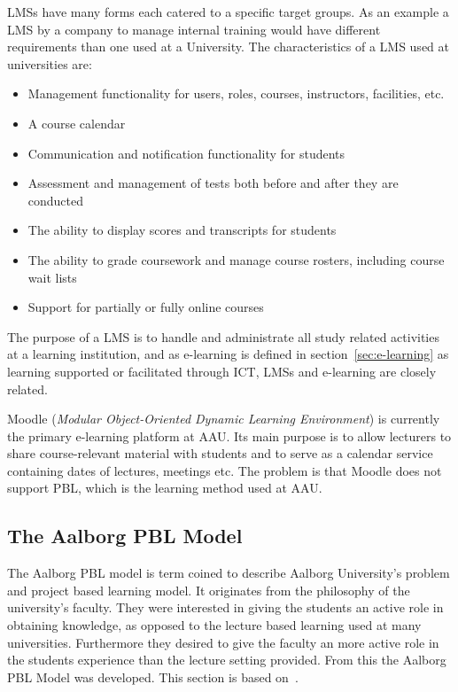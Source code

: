 LMSs have many forms each catered to a specific target groups. As an example a LMS by a company to manage internal training would have different requirements than one used at a University. The characteristics of a LMS used at universities are: 
\begin{itemize}
	\item Management functionality for users, roles, courses, instructors, facilities, etc.
	\item A course calendar
	\item Communication and notification functionality for students
	\item Assessment and management of tests both before and after they are conducted
	\item The ability to display scores and transcripts for students 
	\item The ability to grade coursework and manage course rosters, including course wait lists 
	\item Support for partially or fully online courses
\end{itemize}

The purpose of a LMS is to handle and administrate all study related activities at a learning institution, and as e-learning is defined in section~\ref{sec:e-learning} as learning supported or facilitated through ICT, LMSs and e-learning are closely related.

Moodle (\emph{Modular Object-Oriented Dynamic Learning Environment}) \citep{moodle} is currently the primary e-learning platform at AAU. Its main purpose is to allow lecturers to share course-relevant material with students and to serve as a calendar service containing dates of lectures, meetings etc. The problem is that Moodle does not support PBL, which is the learning method used at AAU.

\subsection{The Aalborg PBL Model}
The Aalborg PBL model is term coined to describe Aalborg University's problem and project based learning model. It originates from the philosophy of the university's faculty. They were interested in giving the students an active role in obtaining knowledge, as opposed to the lecture based learning used at many universities. Furthermore they desired to give the faculty an more active role in the students experience than the lecture setting provided. From this the Aalborg PBL Model was developed. This section is based on~\citep{Barge10}.

